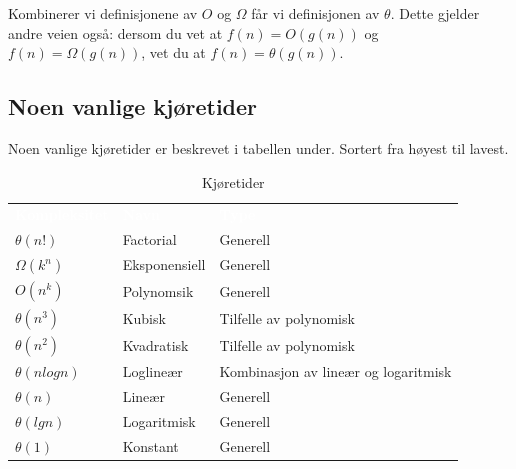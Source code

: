 \noindent Kombinerer vi definisjonene av $O$ og $\Omega$ får vi definisjonen av $\theta$. Dette gjelder andre veien også: dersom du vet at $f(n) = O(g(n))$ og $f(n) = \Omega(g(n))$, vet du at $f(n) = \theta(g(n))$.

\subsection{Noen vanlige kjøretider}
Noen vanlige kjøretider er beskrevet i tabellen under. Sortert fra høyest til lavest.

\begin{table}[H]
    \caption{Kjøretider}
    \label{tab:kjoretider}
    \centering
    \begin{tabular}{|L{15em} | L{15em}|L{15em}|}
        \hline
        \textbf{\textcolor{white}{Kompleksitet}} & \textbf{\textcolor{white}{Navn}} & \textbf{\textcolor{white}{Type}}\\
        $\theta(n!)$ & Factorial & Generell\\
        $\Omega(k^n)$ & Eksponensiell & Generell\\
        $O(n^k)$ & Polynomsik & Generell\\
        $\theta(n^3)$ & Kubisk & Tilfelle av polynomisk\\
        $\theta(n^2)$ & Kvadratisk & Tilfelle av polynomisk\\
        $\theta(n log n)$ & Loglineær & Kombinasjon av lineær og logaritmisk\\
        $\theta(n)$ & Lineær & Generell\\
        $\theta(lg n)$ & Logaritmisk & Generell\\
        $\theta(1)$ & Konstant & Generell\\
         \hline
    \end{tabular}
\end{table}


